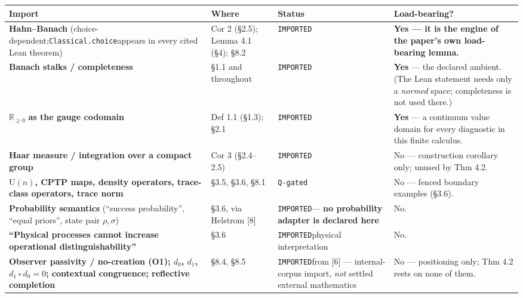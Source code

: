 \documentclass[
  11pt,
]{article}
\begin{document}
\begin{longtable}[]{@{}
  >{\raggedright\arraybackslash}p{}
  >{\raggedright\arraybackslash}p{}
  >{\raggedright\arraybackslash}p{}
  >{\raggedright\arraybackslash}p{}@{}}
\toprule\noalign{}
\begin{minipage}[b]{\linewidth}\raggedright
Import
\end{minipage} & \begin{minipage}[b]{\linewidth}\raggedright
Where
\end{minipage} & \begin{minipage}[b]{\linewidth}\raggedright
Status
\end{minipage} & \begin{minipage}[b]{\linewidth}\raggedright
Load-bearing?
\end{minipage} \\
\midrule\noalign{}
\endhead
\bottomrule\noalign{}
\endlastfoot
\textbf{Hahn--Banach} (choice-dependent;\texttt{Classical.choice}appears in every cited Lean theorem) & Cor 2 (§2.5); Lemma 4.1 (§4); §8.2 & \texttt{IMPORTED} & \textbf{Yes --- it is the engine of the paper's own load-bearing lemma.} \\
\textbf{Banach stalks / completeness} & §1.1 and throughout & \texttt{IMPORTED} & \textbf{Yes} --- the declared ambient. (The Lean statement needs only a \emph{normed} space; completeness is not used there.) \\
\(\mathbb{R}_{\geq 0}\) \textbf{as the gauge codomain} & Def 1.1 (§1.3); §2.1 & \texttt{IMPORTED} & \textbf{Yes} --- a continuum value domain for every diagnostic in this finite calculus. \\
\textbf{Haar measure / integration over a compact group} & Cor 3 (§2.4--2.5) & \texttt{IMPORTED} & No --- construction corollary only; unused by Thm 4.2. \\
\textbf{\(\mathrm{U}(n)\), CPTP maps, density operators, trace-class operators, trace norm} & §3.5, §3.6, §8.1 & \texttt{Q-gated} & No --- fenced boundary examples (§3.6). \\
\textbf{Probability semantics} (``success probability'', ``equal priors'', state pair \(\rho,\sigma\)) & §3.6, via Helstrom {[}8{]} & \texttt{IMPORTED}--- \textbf{no probability adapter is declared here} & No. \\
\textbf{``Physical processes cannot increase operational distinguishability''} & §3.6 & \texttt{IMPORTED}physical interpretation & No. \\
\textbf{Observer passivity / no-creation (O1); \(d_0\), \(d_1\), \(d_1\circ d_0=0\); contextual congruence; reflective completion} & §8.4, §8.5 & \texttt{IMPORTED}from {[}6{]} --- internal-corpus import, \emph{not} settled external mathematics & No --- positioning only; Thm 4.2 rests on none of them. \\
\end{longtable}
\end{document}

